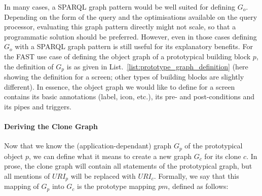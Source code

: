 \documentclass{article}
\begin{document}
In many cases, a SPARQL graph pattern would be well suited for defining $G_o$. Depending on the form of the query and the optimisations available on the query processor, evaluating this graph pattern directly might not scale, so that a programmatic solution should be preferred. However, even in those cases defining $G_o$ with a SPARQL graph pattern is still useful for its explanatory benefits.
For the FAST use case of defining the object graph of a prototypical building block $p$, the definition of $G_p$ is as given in List.~\ref{list:prototype_graph_definition} (here showing the definition for a screen; other types of building blocks are slightly different).
In essence, the object graph we would like to define for a screen contains its basic annotations (label, icon, etc.), its pre- and post-conditions and its pipes and triggers.

\singlespacing
{}
\begin{figure}
	
\end{figure}
\doublespacing





\paragraph{Deriving the Clone Graph} %
\label{par:deriving_the_}

Now that we know the (application-dependant) graph $G_p$ of the prototypical object $p$, we can define what it means to create a new graph $G_c$ for its clone $c$. In prose, the clone graph will contain all statements of the prototypical graph, but all mentions of $URI_p$ will be replaced with $URI_c$. Formally, we say that this mapping of $G_p$ into $G_c$ is the prototype mapping $pm$, defined as follows:
\end{document}
